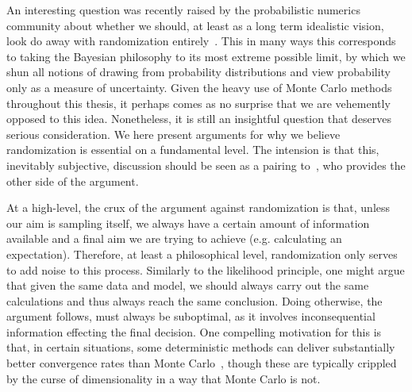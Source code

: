 An interesting question was recently raised by the probabilistic numerics~\citep{hennig2015probabilistic}
community about whether we should, at least as a long term idealistic vision, look do away with randomization entirely~\citep{schober2017thesis}.
This in many ways this corresponds to taking the Bayesian philosophy to its most extreme possible
limit, by which we shun all notions of drawing from probability distributions and view probability only as a measure
of uncertainty.  Given the heavy use of Monte Carlo methods throughout this thesis,
it perhaps comes as no surprise that we are vehemently opposed to this idea.  Nonetheless, it is still an insightful
question that deserves serious consideration.  We here present arguments for why we believe randomization is essential
on a fundamental level. The intension is that this, inevitably subjective,
discussion should be seen as a pairing to~\citep{schober2017thesis}, who provides the other side of the argument.

 At a high-level, the crux of the argument against randomization is that, 
 unless our aim 
is sampling itself, we always have a certain amount of information available and a final aim we are trying to achieve (e.g.
calculating an expectation).  Therefore, at least a philosophical level, randomization only serves to add noise to this
process.  
Similarly to the likelihood principle, one might argue that given the same data and model, we should 
always carry out the same calculations and thus always reach the same conclusion.  Doing otherwise,
the argument follows, must always be suboptimal, as it involves inconsequential information effecting the final
decision.  One compelling motivation for this is that, in certain situations, some deterministic
methods can deliver substantially better convergence rates than Monte Carlo~\citep{briol2016fwbq,caflisch1998monte}, 
though these are typically crippled by the curse of dimensionality in a way that Monte Carlo is not.

